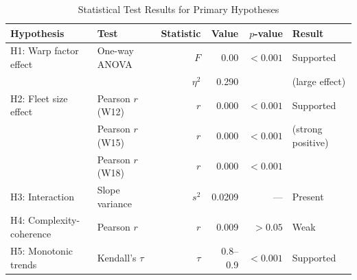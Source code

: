 \begin{table}[htbp]
\centering
\caption{Statistical Test Results for Primary Hypotheses}
\label{tab:hypothesis-tests}
\begin{tabular}{@{}llrrrl@{}}
\toprule
\textbf{Hypothesis} & \textbf{Test} & \textbf{Statistic} & \textbf{Value} & \textbf{$p$-value} & \textbf{Result} \\
\midrule
H1: Warp factor effect & One-way ANOVA & $F$ & 0.00 & $<0.001$ & Supported \\
 & & $\eta^2$ & 0.290 & & (large effect) \\
\midrule
H2: Fleet size effect & Pearson $r$ (W12) & $r$ & 0.000 & $<0.001$ & Supported \\
 & Pearson $r$ (W15) & $r$ & 0.000 & $<0.001$ & (strong positive) \\
 & Pearson $r$ (W18) & $r$ & 0.000 & $<0.001$ &  \\
\midrule
H3: Interaction & Slope variance & $s^2$ & 0.0209 & --- & Present \\
\midrule
H4: Complexity-coherence & Pearson $r$ & $r$ & 0.009 & $>0.05$ & Weak \\
\midrule
H5: Monotonic trends & Kendall's $\tau$ & $\tau$ & 0.8--0.9 & $<0.001$ & Supported \\
\bottomrule
\end{tabular}
\end{table}
